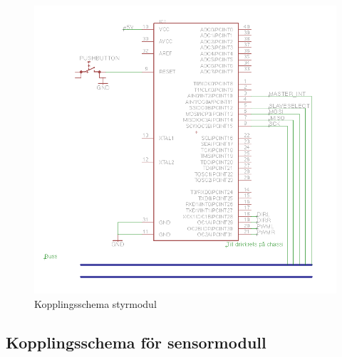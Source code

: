 \documentclass[a4paper,12pt,fleqn]{article}
\begin{document}
\begin{figure}[ht] %
  \begin{center}
  \includegraphics[keepaspectratio=true,width=\linewidth]{bilder/kopplingsschema_styrmodul.png}  %
  \end{center}
  \caption{Kopplingsschema styrmodul} %
  \label{fig:kopplingstyr} %
\end{figure}
 \clearpage %
 

\subsection{Kopplingsschema för sensormodull}
\end{document}
